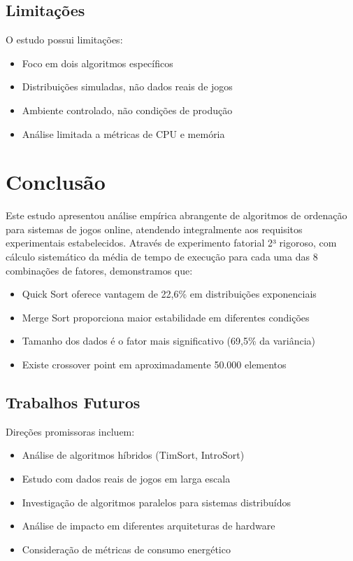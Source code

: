 \documentclass[conference]{IEEEtran}
\begin{document}
\subsection{Limitações}

O estudo possui limitações:
\begin{itemize}
\item Foco em dois algoritmos específicos
\item Distribuições simuladas, não dados reais de jogos
\item Ambiente controlado, não condições de produção
\item Análise limitada a métricas de CPU e memória
\end{itemize}

\section{Conclusão}

Este estudo apresentou análise empírica abrangente de algoritmos de ordenação para sistemas de jogos online, atendendo integralmente aos requisitos experimentais estabelecidos. Através de experimento fatorial 2³ rigoroso, com cálculo sistemático da média de tempo de execução para cada uma das 8 combinações de fatores, demonstramos que:

\begin{itemize}
\item Quick Sort oferece vantagem de 22,6\% em distribuições exponenciais
\item Merge Sort proporciona maior estabilidade em diferentes condições
\item Tamanho dos dados é o fator mais significativo (69,5\% da variância)
\item Existe crossover point em aproximadamente 50.000 elementos
\end{itemize}

\subsection{Trabalhos Futuros}

Direções promissoras incluem:
\begin{itemize}
\item Análise de algoritmos híbridos (TimSort, IntroSort)
\item Estudo com dados reais de jogos em larga escala
\item Investigação de algoritmos paralelos para sistemas distribuídos
\item Análise de impacto em diferentes arquiteturas de hardware
\item Consideração de métricas de consumo energético
\end{itemize}
\end{document}

